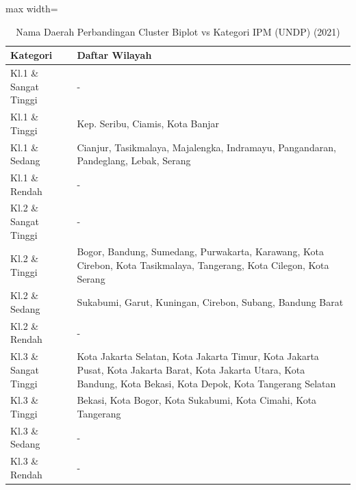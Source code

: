 \begin{table}[H]
\centering
\caption{Nama Daerah Perbandingan Cluster Biplot vs Kategori IPM (UNDP) (2021)} \label{tab:appcrossname2021}
\begin{adjustbox}{max width=\textwidth}
\begin{tabular}{|p{4cm}|p{10cm}|}
\hline
\textbf{Kategori} & \textbf{Daftar Wilayah} \\
\hline
Kl.1 \& Sangat Tinggi & - \\
\hline
Kl.1 \& Tinggi & Kep. Seribu, Ciamis, Kota Banjar \\
\hline
Kl.1 \& Sedang & Cianjur, Tasikmalaya, Majalengka, Indramayu, Pangandaran, Pandeglang, Lebak, Serang \\
\hline
Kl.1 \& Rendah & - \\
\hline
Kl.2 \& Sangat Tinggi & - \\
\hline
Kl.2 \& Tinggi & Bogor, Bandung, Sumedang, Purwakarta, Karawang, Kota Cirebon, Kota Tasikmalaya, Tangerang, Kota Cilegon, Kota Serang \\
\hline
Kl.2 \& Sedang & Sukabumi, Garut, Kuningan, Cirebon, Subang, Bandung Barat \\
\hline
Kl.2 \& Rendah & - \\
\hline
Kl.3 \& Sangat Tinggi & Kota Jakarta Selatan, Kota Jakarta Timur, Kota Jakarta Pusat, Kota Jakarta Barat, Kota Jakarta Utara, Kota Bandung, Kota Bekasi, Kota Depok, Kota Tangerang Selatan \\
\hline
Kl.3 \& Tinggi & Bekasi, Kota Bogor, Kota Sukabumi, Kota Cimahi, Kota Tangerang \\
\hline
Kl.3 \& Sedang & - \\
\hline
Kl.3 \& Rendah & - \\
\hline
\end{tabular}
\end{adjustbox}
\end{table}